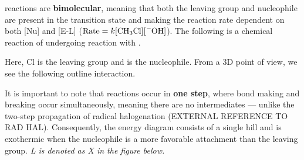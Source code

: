 \documentclass[10pt]{article}
\begin{document}
  \begin{core}{\snt}
    
    \snt reactions are \textbf{bimolecular}, meaning that both the leaving group and nucleophile are present in the transition state and making the reaction rate dependent on both [Nu] and [E-L] ($\text{Rate} = k[\ce{CH3Cl}][\ce{^-OH}]$). The following is a chemical reaction of  undergoing \snt reaction with .

    \vspace{15pt}

    Here, Cl is the leaving group and  is the nucleophile. From a 3D point of view, we see the following outline interaction.


    It is important to note that \snt reactions occur in \textbf{one step}, where bond making and breaking occur simultaneously, meaning there are no intermediates --- unlike the two-step propagation of radical halogenation (EXTERNAL REFERENCE TO RAD HAL). Consequently, the energy diagram consists of a single hill and is exothermic when the nucleophile is a more favorable attachment than the leaving group. \textit{L is denoted as X in the figure below.}


\end{core}
\end{document}
